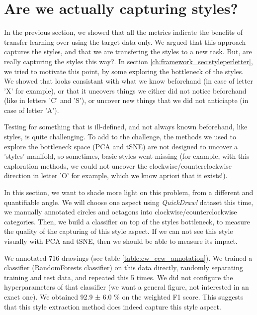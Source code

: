 \section{Are we actually capturing styles?}
\par In the previous section, we showed that all the metrics indicate the benefits of transfer learning over using the target data only. We argued that this approach captures the styles, and that we are transfering the styles to a new task. But, are really capturing the styles this way?. In section \ref{ch:framework_sec:styleperletter}, we tried to motivate this point, by some exploring the bottleneck of the styles. We showed that looks consistant with what we know beforehand (in case of letter 'X' for example), or that it uncovers things we either did not notice beforehand (like in letters 'C' and 'S'), or uncover new things that we did not anticiapte (in case of letter 'A').

\par Testing for something that is ill-defined, and not always known beforehand, like styles, is quite challenging. To add to the challenge, the methods we used to explore the bottleneck space (PCA and tSNE) are not designed to uncover a 'styles' manifold, so sometimes, basic styles went missing (for example, with this exploration methods, we could not uncover the clockwise/counterclockwise direction in letter 'O' for example, which we know apriori that it exists!).

\par In this section, we want to shade more light on this problem, from a different and quantifiable angle. We will choose one aspect using \textit{QuickDraw!} dataset this time, we manually annotated circles and octagons into clockwise/counterclockwise categories. Then, we build a classifier on top of the styles bottleneck, to measure the quality of the capturing of this style aspect. If we can not see this style visually with PCA and tSNE, then we should be able to measure its impact.

\par We annotated 716 drawings (see table \ref{table:cw_ccw_annotation}). We trained a classifier (RandomForests classifier) on this data directly, randomly separating training and test data, and repeated this 5 times. We did not configure the hyperparameters of that classifier (we want a general figure, not interested in an exact one). We obtained 92.9 ± 6.0 \% on the weighted F1 score. This suggests that this style extraction method does indeed capture this style aspect.

